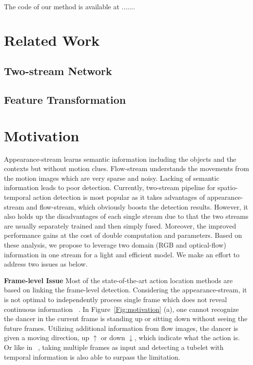 \documentclass[10pt,twocolumn,letterpaper]{article}
\begin{document}
The code of our method is available at .......





\section{Related Work}

\subsection{Two-stream Network}

\subsection{Feature Transformation}
\section{Motivation}
Appearance-stream learns semantic information including the objects and the contexts but without motion clues. Flow-stream understands the movements from the motion images which are very sparse and noisy. Lacking of semantic information leads to poor detection. Currently, two-stream pipeline for spatio-temporal action detection is most popular as it takes advantages of appearance-stream and flow-stream, which obviously boosts the detection results. However, it also holds up the disadvantages of each single stream due to that the two streams are usually separately trained and then simply fused. Moreover, the improved performance gains at the cost of double computation and parameters. Based on these analysis, we propose to leverage two domain (RGB and optical-flow) information in one stream for a light and efficient model. We make an effort to address two issues as below.

{\bf{Frame-level Issue}} Most of the state-of-the-art action location methods are based on linking the frame-level detection. Considering the appearance-stream, it is not optimal to independently process single frame which does not reveal continuous information ~\cite{Kalogeithon2017}. In Figure~\ref{Fig:motivation} (a), one cannot recognize the dancer in the current frame is standing up or sitting down without seeing the future frames. Utilizing additional information from flow images, the dancer is given a moving direction, up $\uparrow$ or down $\downarrow$, which indicate what the action is. Or like in ~\cite{Kalogeithon2017}, taking multiple frames as input and detecting a tubelet with temporal information is also able to surpass the limitation. 
\end{document}
